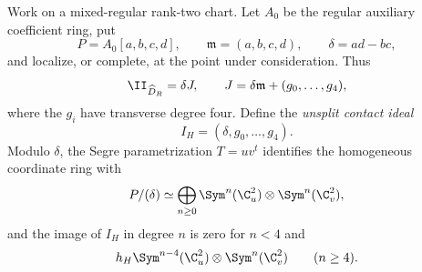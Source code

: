 Work on a mixed-regular rank-two chart.  Let \(A_0\) be the regular
auxiliary coefficient ring, put
\[
 P=A_0[a,b,c,d],\qquad
 \mathfrak m=(a,b,c,d),\qquad
 \delta=ad-bc,
\]
and localize, or complete, at the point under consideration.  Thus
\[
 \II_{\widehat D_R}=\delta J,\qquad
 J=\delta\mathfrak m+(g_0,\ldots,g_4),
\]
where the \(g_i\) have transverse degree four.  Define the
\emph{unsplit contact ideal}
\begin{equation}\label{eq:contact-saturated-ideal}
 I_H=(\delta,g_0,\ldots,g_4).
\end{equation}
Modulo \(\delta\), the Segre parametrization \(T=uv^t\) identifies
the homogeneous coordinate ring with
\[
 P/(\delta)
 \simeq
 \bigoplus_{n\ge0}
 \Sym^n(\C^2_u)\otimes\Sym^n(\C^2_v),
\]
and the image of \(I_H\) in degree \(n\) is zero for \(n<4\) and
\begin{equation}\label{eq:contact-graded-sections}
 h_H\Sym^{n-4}(\C^2_u)\otimes\Sym^n(\C^2_v)
 \qquad(n\ge4).
\end{equation}

